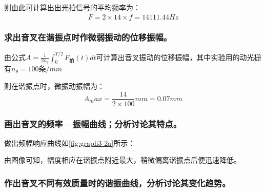 \documentclass[dvipsnames, svgnames,a4paper,11pt]{article}
\begin{document}
	则由此可计算出出光拍信号的平均频率为：
	\[
		\bar{F}=2\times14\times f=14111.44Hz
	\]





	\subsubsection{求出音叉在谐振点时作微弱振动的位移振幅。}


	由公式$ A =\frac{1}{2n_\theta} \int_0^{T/2} F_{拍}(t)  dt $可计算出音叉振动的位移振幅，其中实验用的动光栅有$n_\theta=100条/mm$

	则在谐振点时，微振动振幅为：
	\[
		A_max=\frac{14}{2\times100}mm=0.07mm	
	\]




	\subsubsection{画出音叉的频率—振幅曲线；分析讨论其特点。}







	做出频幅响应曲线如\cref{fig:graph3-2a}所示：


	\begin{figure}[htbp]
		\centering
		\quad
		\quad
		\label{fig:graph10}
	\end{figure}



	由图像可知，幅度相应在谐振点附近最大，稍微偏离谐振点后便迅速降低。





	\subsubsection{作出音叉不同有效质量时的谐振曲线，分析讨论其变化趋势。}
		
\end{document}
